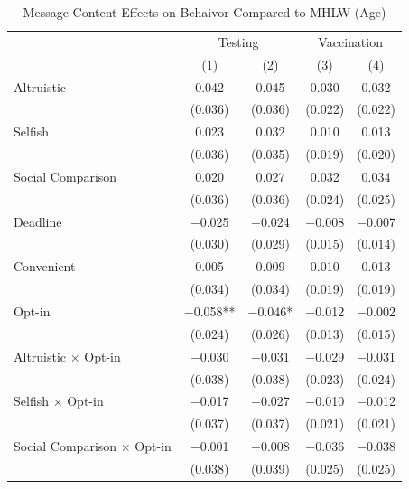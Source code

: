 \documentclass[
]{article}
\begin{document}
\begin{table}

\caption{\label{tab:reg-act-woA}Message Content Effects on Behaivor Compared to MHLW (Age)}
\centering
\fontsize{9}{11}\selectfont
\begin{threeparttable}
\begin{tabular}[t]{lcccc}
\toprule
\multicolumn{1}{c}{ } & \multicolumn{2}{c}{Testing} & \multicolumn{2}{c}{Vaccination} \\
\cmidrule(l{3pt}r{3pt}){2-3} \cmidrule(l{3pt}r{3pt}){4-5}
  & (1) & (2) & (3) & (4)\\
\midrule
Altruistic & \num{0.042} & \num{0.045} & \num{0.030} & \num{0.032}\\
 & (\num{0.036}) & (\num{0.036}) & (\num{0.022}) & (\num{0.022})\\
Selfish & \num{0.023} & \num{0.032} & \num{0.010} & \num{0.013}\\
 & (\num{0.036}) & (\num{0.035}) & (\num{0.019}) & (\num{0.020})\\
Social Comparison & \num{0.020} & \num{0.027} & \num{0.032} & \num{0.034}\\
 & (\num{0.036}) & (\num{0.036}) & (\num{0.024}) & (\num{0.025})\\
Deadline & \num{-0.025} & \num{-0.024} & \num{-0.008} & \num{-0.007}\\
 & (\num{0.030}) & (\num{0.029}) & (\num{0.015}) & (\num{0.014})\\
Convenient & \num{0.005} & \num{0.009} & \num{0.010} & \num{0.013}\\
 & (\num{0.034}) & (\num{0.034}) & (\num{0.019}) & (\num{0.019})\\
Opt-in & \num{-0.058}** & \num{-0.046}* & \num{-0.012} & \num{-0.002}\\
 & (\num{0.024}) & (\num{0.026}) & (\num{0.013}) & (\num{0.015})\\
Altruistic $\times$ Opt-in & \num{-0.030} & \num{-0.031} & \num{-0.029} & \num{-0.031}\\
 & (\num{0.038}) & (\num{0.038}) & (\num{0.023}) & (\num{0.024})\\
Selfish $\times$ Opt-in & \num{-0.017} & \num{-0.027} & \num{-0.010} & \num{-0.012}\\
 & (\num{0.037}) & (\num{0.037}) & (\num{0.021}) & (\num{0.021})\\
Social Comparison $\times$ Opt-in & \num{-0.001} & \num{-0.008} & \num{-0.036} & \num{-0.038}\\
 & (\num{0.038}) & (\num{0.039}) & (\num{0.025}) & (\num{0.025})\\

\end{tabular}
\end{threeparttable}
\end{table}
\end{document}

